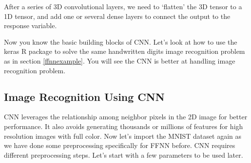 \documentclass[
  12pt,
]{krantz}
\makeatletter
\newenvironment{Shaded}{\begin{snugshade}}{\end{snugshade}}
\newcommand{\CommentTok}[1]{\textcolor[rgb]{0.37,0.37,0.37}{\textit{#1}}}
\newcommand{\DecValTok}[1]{\textcolor[rgb]{0.06,0.06,0.06}{#1}}
\newcommand{\FunctionTok}[1]{\textcolor[rgb]{0,0,0}{#1}}
\newcommand{\NormalTok}[1]{#1}
\newcommand{\OtherTok}[1]{\textcolor[rgb]{0.37,0.37,0.37}{#1}}
\newcommand{\SpecialCharTok}[1]{\textcolor[rgb]{0,0,0}{#1}}
\newenvironment{kframe}{%
\medskip{}
\setlength{\fboxsep}{.8em}
 \def\at@end@of@kframe{}%
 \ifinner\ifhmode%
  \def\at@end@of@kframe{\end{minipage}}%
  \begin{minipage}{\columnwidth}%
 \fi\fi%
 \def\FrameCommand##1{\hskip\@totalleftmargin \hskip-\fboxsep
 \colorbox{shadecolor}{##1}\hskip-\fboxsep
     \hskip-\linewidth \hskip-\@totalleftmargin \hskip\columnwidth}%
 \MakeFramed {\advance\hsize-\width
   \@totalleftmargin\z@ \linewidth\hsize
   \@setminipage}}%
 {\par\unskip\endMakeFramed%
 \at@end@of@kframe}
\renewenvironment{Shaded}{\begin{kframe}}{\end{kframe}}
\makeatother
\begin{document}
After a series of 3D convolutional layers, we need to `flatten' the 3D tensor to a 1D tensor, and add one or several dense layers to connect the output to the response variable.

Now you know the basic building blocks of CNN. Let's look at how to use the keras R package to solve the same handwritten digits image recognition problem as in section \ref{ffnnexample}. You will see the CNN is better at handling image recognition problem.

\hypertarget{cnnexample}{%
\subsection{Image Recognition Using CNN}\label{cnnexample}}

CNN leverages the relationship among neighbor pixels in the 2D image for better performance. It also avoids generating thousands or millions of features for high resolution images with full color. Now let's import the MNIST dataset again as we have done some preprocessing specifically for FFNN before. CNN requires different preprocessing steps. Let's start with a few parameters to be used later.

\begin{Shaded}
\end{Shaded}
\end{document}
